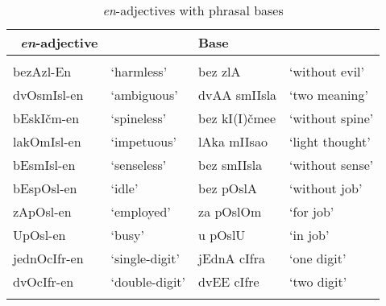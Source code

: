 \documentclass[output=paper]{langsci/langscibook}
\begin{document}
\begin{table}
\caption{\textit{en}-adjectives with phrasal bases}          
\label{tabapp14}          
 \begin{tabular}{ l l l l}          
\lsptoprule            
\ \textit{en}-adjective &  & Base &    
\\ 
\hline
\\  bezAzl-En & `harmless' & bez zlA & `without evil' 
\\  dvOsmIsl-en & `ambiguous' & dvAA smIIsla & `two meaning'
\\  bEskIčm-en & `spineless' & bez kI(I)čmee & `without spine'
\\  lakOmIsl-en & `impetuous' & lAka mIIsao & `light thought'
\\  bEsmIsl-en & `senseless' & bez smIIsla & `without sense'  
\\  bEspOsl-en & `idle' & bez pOslA & `without job' 
\\  zApOsl-en & `employed' & za pOslOm & `for job' 
\\  UpOsl-en  & `busy' & u pOslU & `in job' 
\\  jednOcIfr-en & `single-digit' & jEdnA cIfra & `one digit' 
\\  dvOcIfr-en & `double-digit' & dvEE cIfre & `two digit' 
\\
 \lspbottomrule      
 \end{tabular}          
\end{table}           

 
										
\sloppy
\printbibliography[heading=subbibliography,notkeyword=this]
\end{document}
